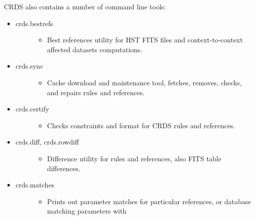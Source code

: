 \documentclass[letterpaper,10pt,english]{sphinxmanual}
\begin{document}
CRDS also contains a number of command line tools:
\begin{itemize}
\item {} \begin{description}
\item[{crds.bestrefs}] \leavevmode\begin{itemize}
\item {} 
Best references utility for HST FITS files and context-to-context affected datasets computations.

\end{itemize}

\end{description}

\item {} \begin{description}
\item[{crds.sync}] \leavevmode\begin{itemize}
\item {} 
Cache download and maintenance tool, fetches, removes, checks, and repairs rules and references.

\end{itemize}

\end{description}

\item {} \begin{description}
\item[{crds.certify}] \leavevmode\begin{itemize}
\item {} 
Checks constraints and format for CRDS rules and references.

\end{itemize}

\end{description}

\item {} \begin{description}
\item[{crds.diff, crds.rowdiff}] \leavevmode\begin{itemize}
\item {} 
Difference utility for rules and references,  also FITS table differences.

\end{itemize}

\end{description}

\item {} \begin{description}
\item[{crds.matches}] \leavevmode\begin{itemize}
\item {} 
Prints out parameter matches for particular references,  or database matching parameters with


\end{itemize}
\end{description}
\end{itemize}
\end{document}
